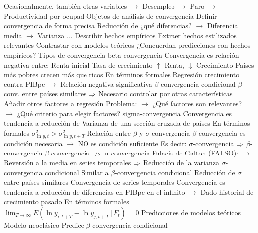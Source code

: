 \documentclass{nuevotema}
\begin{document}
\begin{esquemal}
				\4[] Ocasionalmente, también otras variables
				\4[] $\to$ Desempleo
				\4[] $\to$ Paro
				\4[] $\to$ Productividad por ocupad
			\3 Objetos de análisis de convergencia
				\4 Definir convergencia de forma precisa
				\4[] Reducción de ¿qué diferencias?
				\4[] $\to$ Diferencia media
				\4[] $\to$ Varianza
				\4[] ...
				\4 Describir hechos empíricos
				\4[] Extraer hechos estilizados relevantes
				\4 Contrastar con modelos teóricos
				\4[] ¿Concuerdan predicciones con hechos empíricos?
		\2 Tipos de convergencia
			\3 beta-convergencia
				\4 Convergencia es relación negativa entre:
				\4[] Renta inicial
				\4[] Tasa de crecimiento
				\4[$\then$] $\uparrow$ Renta, $\downarrow$ Crecimiento
				\4[$\then$] Países más pobres crecen más que ricos
				\4 En términos formales
				\4[] Regresión crecimiento contra PIBpc
				\4[] $\to$ Relación negativa significativa
				\4[] 
				\4 $\beta$-convergencia condicional
				\4[] $\beta$-conv. entre países similares
				\4[] $\then$ Necesario controlar por otras características
				\4[] Añadir otros factores a regresión
				\4[] 
				\4[] Problema:
				\4[] $\to$ ¿Qué factores son relevantes?
				\4[] $\to$ ¿Qué criterio para elegir factores?
			\3 sigma-convergencia
				\4 Convergencia es tendencia a reducción de
				\4[] Varianza de una sección cruzada de países
				\4 En términos formales
				\4[] $\sigma^2_{\ln y,t} > \sigma^2_{\ln y, t+T} $
				\4 Relación entre $\beta$ y $\sigma$-convergencia
				\4[] $\beta$-convergencia es condición necesaria
				\4[] $\to$ NO es condición suficiente
				\4[] Es decir:
				\4[] $\sigma$-convergencia $\then$ $\beta$-convergencia
				\4[] $\beta$-convergencia $\nRightarrow$ $\sigma$-convergencia
				\4[] Falacia de Galton (FALSO):
				\4[] $\to$ Reversión a la media en series temporales
				\4[] $\then$ Reducción de la varianza
				\4[] 
				\4 $\sigma$-convergencia condicional
				\4[] Similar a $\beta$-convergencia condicional
				\4[] Reducción de $\sigma$ entre países similares
			\3 Convergencia de series temporales
				\4 Convergencia es tendencia a reducción de
				\4[] diferencias en PIBpc en el infinito
				\4[] $\to$ Dado historial de crecimiento pasado
				\4 En términos formales
				\4[] $\lim_{T\to \infty} E\left( \ln y_{i, t+T} - \ln y_{j, t+T} \, | \, F_t \right) = 0$
		\2 Predicciones de modelos teóricos
			\3 Modelo neoclásico
				\4 Predice $\beta$-convergencia condicional

\end{esquemal}
\end{document}
